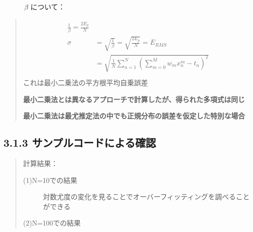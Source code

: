 \documentclass[letterpaper,10pt,dvipdfmx]{sphinxmanual}
\begin{document}
　　　\(\beta\) について：
\begin{quote}
\begin{align*}\!\begin{aligned}
\frac{1}{\beta} = \frac{2 E_p}{N}\\
\sigma &= \sqrt{\frac{1}{\beta}} = \sqrt{\frac{2 E_p}{N}} = E_{RMS} \\
       &= \sqrt{\frac{1}{N} \sum_{n=1}^{N} \left ( \sum_{m=0}^{M} w_m x_n^m -t_n \right )^2 }\\
\end{aligned}\end{align*}
これは最小二乗法の平方根平均自乗誤差

\textbf{最小二乗法とは異なるアプローチで計算したが、得られた多項式は同じ}

\textbf{最小二乗法は最尤推定法の中でも正規分布の誤差を仮定した特別な場合}
\end{quote}


\subsection{3.1.3 サンプルコードによる確認}
\label{Chapter_3_MLE:id8}\begin{quote}

計算結果：
\begin{description}
\item[{(1)N=10での結果}] \leavevmode
\noindent{}

対数尤度の変化を見ることでオーバーフィッティングを調べることができる

\noindent{}

\item[{(2)N=100での結果}] \leavevmode
\noindent{}

\noindent{}

\end{description}
\end{quote}
\end{document}
